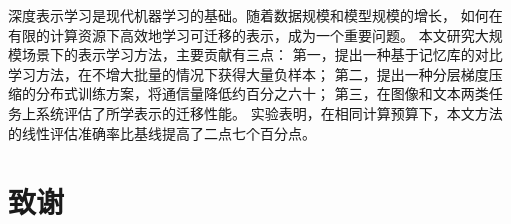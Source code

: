\documentclass[UTF8,ugly,fontset=fandol]{pkuthss}
\begin{document}
\frontmatter
\pagestyle{empty}
\maketitle
\cleardoublepage

\cleardoublepage
\pagestyle{plain}
\setcounter{page}{0}
\begin{cabstract}
深度表示学习是现代机器学习的基础。随着数据规模和模型规模的增长，
如何在有限的计算资源下高效地学习可迁移的表示，成为一个重要问题。
本文研究大规模场景下的表示学习方法，主要贡献有三点：
第一，提出一种基于记忆库的对比学习方法，在不增大批量的情况下获得大量负样本；
第二，提出一种分层梯度压缩的分布式训练方案，将通信量降低约百分之六十；
第三，在图像和文本两类任务上系统评估了所学表示的迁移性能。
实验表明，在相同计算预算下，本文方法的线性评估准确率比基线提高了二点七个百分点。
\end{cabstract}
\begin{eabstract}

\end{eabstract}
\tableofcontents
\mainmatter







\appendix

\backmatter
\chapter{致谢}


\end{document}

